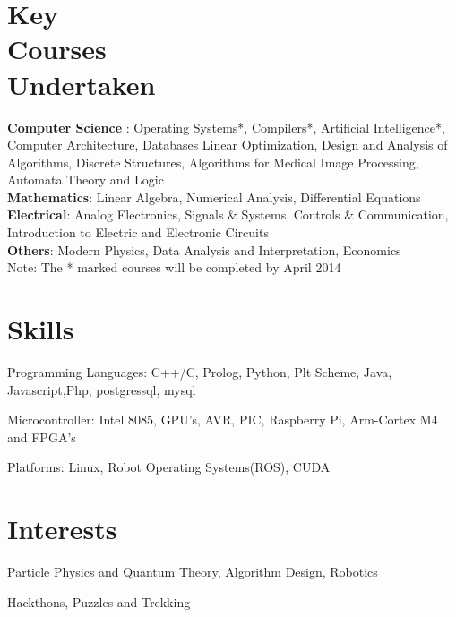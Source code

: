 \documentclass[margin,11pt]{resume}
\begin{document}
\begin{resume}
\vspace{-1mm}
\section{\mysidestyle Key\\ Courses\\ Undertaken}

\textbf{Computer Science} :
Operating Systems*, Compilers*, Artificial Intelligence*, 
Computer Architecture, Databases
Linear Optimization, 
Design and Analysis of Algorithms, 
Discrete Structures, Algorithms for Medical Image Processing, 
Automata Theory and Logic\\       
\textbf{Mathematics}: Linear Algebra, Numerical Analysis, Differential Equations\\
\textbf{Electrical}: Analog Electronics, Signals \& Systems, Controls \& Communication, Introduction to Electric and Electronic Circuits\\
\textbf{Others}: Modern Physics, Data Analysis and Interpretation, Economics
\\Note: The * marked courses will be completed by April 2014

\vspace{-1mm}
\section{\mysidestyle Skills}
\begin{list2}
\item Programming Languages: C++/C, Prolog, Python, Plt Scheme, Java, Javascript,Php, postgressql, mysql
\item Microcontroller: Intel 8085, GPU's, AVR, PIC, Raspberry Pi, Arm-Cortex M4 and  FPGA's
\item Platforms: Linux, Robot Operating Systems(ROS), CUDA
\end{list2}	
\section{\mysidestyle Interests} 
\begin{list2}
\item Particle Physics and Quantum Theory, Algorithm Design, Robotics
\item Hackthons, Puzzles and Trekking		
\end{list2}
\end{resume}
\end{document}
